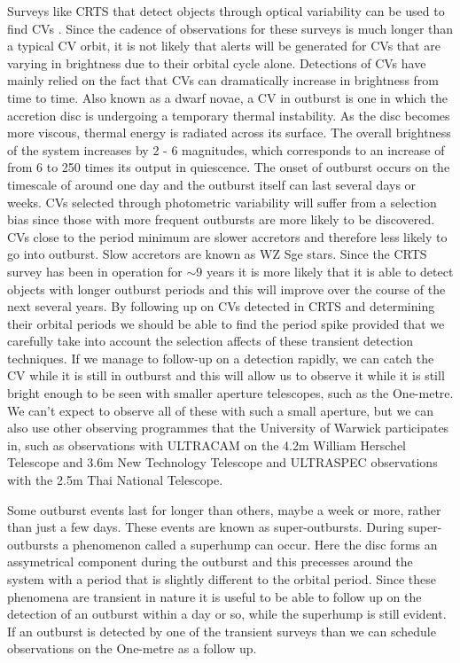 \documentclass[a4paper,fleqn,usenatbib]{mnras}
\begin{document}
Surveys like CRTS that detect objects through optical variability can be used to find CVs \citep{Breedt2014}. Since the cadence of observations for these surveys is much longer than a typical CV orbit, it is not likely that alerts will be generated for CVs that are varying in brightness due to their orbital cycle alone. Detections of CVs have mainly relied on the fact that CVs can dramatically increase in brightness from time to time. Also known as a dwarf novae, a CV in outburst is one in which the accretion disc is undergoing a temporary thermal instability. As the disc becomes more viscous, thermal energy is radiated across its surface. The overall brightness of the system increases by 2 - 6 magnitudes, which corresponds to an increase of from 6 to 250 times its output in quiescence.  The onset of outburst occurs on the timescale of around one day and the outburst itself can last several days or weeks. CVs selected through photometric variability will suffer from a selection bias since those with more frequent outbursts are more likely to be discovered. CVs close to the period minimum are slower accretors and therefore less likely to go into outburst. Slow accretors are known as WZ Sge stars. Since the CRTS survey has been in operation for $\sim 9$ years it is more likely that it is able to detect objects with longer outburst periods and this will improve over the course of the next several years. By following up on CVs detected in CRTS and determining their orbital periods we should be able to find the period spike provided that we carefully take into account the selection affects of these transient detection techniques. If we manage to follow-up on a detection rapidly, we can catch the CV while it is still in outburst and this will allow us to observe it while it is still bright enough to be seen with smaller aperture telescopes, such as the One-metre. We can't expect to observe all of these with such a small aperture, but we can also use other observing programmes that the University of Warwick participates in, such as observations with ULTRACAM on the 4.2m William Herschel Telescope and 3.6m New Technology Telescope and ULTRASPEC observations with the 2.5m Thai National Telescope. 

Some outburst events last for longer than others, maybe a week or more, rather than just a few days. These events are known as super-outbursts. During super-outbursts a phenomenon called a superhump can occur. Here the disc forms an assymetrical component during the outburst and this precesses around the system with a period that is slightly different to the orbital period. Since these phenomena are transient in nature it is useful to be able to follow up on the detection of an outburst within a day or so, while the superhump is still evident. If an outburst is detected by one of the transient surveys than we can schedule observations on the One-metre as a follow up. 
\end{document}
